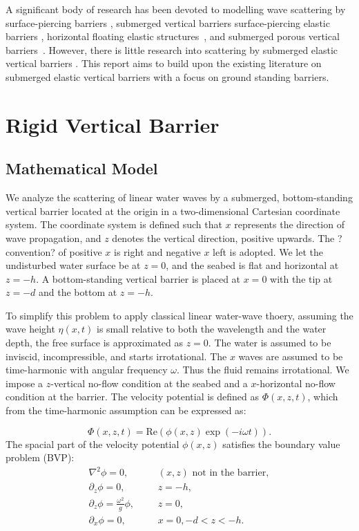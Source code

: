 \documentclass[a4paper,12pt]{report}
\begin{document}
A significant body of research has been devoted to modelling wave scattering by surface-piercing barriers \cite{10.1093/imamat/35.3.339, PARSONS1994129, Porter1995ComplementaryAT}, submerged vertical barriers \cite{Porter1995ComplementaryAT} surface-piercing elastic barriers \cite{doi:10.1137/090756557}, horizontal floating elastic structures~\cite{MontielFabienFranck2012NaEA}, and submerged porous vertical barriers~\cite{VIJAY2020102206}. However, there is little research into scattering by submerged elastic vertical barriers \cite{elasticVerticalBerrier2013}. This report aims to build upon the existing literature on submerged elastic vertical barriers with a focus on ground standing barriers.

\chapter{Rigid Vertical Barrier}
\section{Mathematical Model}
\label{sec:mathModel}
We analyze the scattering of linear water waves by a submerged, bottom-standing vertical barrier located at the origin in a two-dimensional Cartesian coordinate system. The coordinate system is defined such that $x$ represents the direction of wave propagation, and $z$ denotes the vertical direction, positive upwards. The ?convention? of positive $x$ is right and negative $x$ left is adopted. We let the undisturbed water surface be at $z=0$, and the seabed is flat and horizontal at $z=-h$. A bottom-standing vertical barrier is placed at $x=0$ with the tip at $z=-d$ and the bottom at $z=-h$. 

To simplify this problem to apply classical linear water-wave thoery, assuming the wave height $\eta(x,t)$ is small relative to both the wavelength and the water depth, the free surface is approximated as $z=0$. The water is assumed to be inviscid, incompressible, and starts irrotational. The $x$ waves are assumed to be time-harmonic with angular frequency $\omega$. Thus the fluid remains irrotational. We impose a $z$-vertical no-flow condition at the seabed and a $x$-horizontal no-flow condition at the barrier. The velocity potential is defined as $\Phi(x,z,t)$, which from the time-harmonic assumption can be expressed as:

\begin{equation}
\label{eq:time-harmonic}
\Phi(x,z,t) = \text{Re}(\phi(x,z)\exp(-i\omega t)).
\end{equation}
The spacial part of the velocity potential $\phi(x,z)$ satisfies the boundary value problem (BVP):
\begin{align}
\label{eq:irrotational}
\nabla^2 \phi = 0,&  &&(x,z) \text{ not in the barrier}, \\
\label{eq:noFlowGround}
\partial_z \phi = 0,&  &&z = -h, \\
\label{eq:freeSurface}
\partial_z \phi = \frac{\omega^2}{g}\phi,&  &&z = 0, \\
\label{eq:noFlowBarrier}
\partial_x \phi= 0,&  &&x = 0, -d < z < -h.
\end{align}
\end{document}
